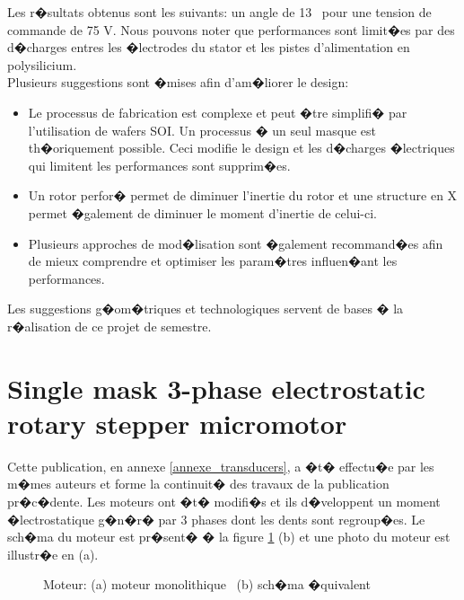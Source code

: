 Les r�sultats obtenus sont les suivants: un angle de 13 \degre \  pour une tension de commande de 75 V. Nous pouvons noter que performances sont limit�es par des d�charges entres les �lectrodes du stator et les pistes d'alimentation en polysilicium.\\


\noindent Plusieurs suggestions sont �mises afin d'am�liorer le design:
\label{am�liorations}
\begin{itemize}
\item Le processus de fabrication est complexe et peut �tre simplifi� par l'utilisation de wafers SOI. Un processus � un seul masque est th�oriquement possible. Ceci modifie le design et les d�charges �lectriques qui limitent les performances sont supprim�es.
\item Un rotor perfor� permet de diminuer l'inertie du rotor et une structure en X permet �galement de diminuer le moment d'inertie de celui-ci.
\item Plusieurs approches de mod�lisation sont �galement recommand�es afin de mieux comprendre et optimiser les param�tres influen�ant les performances.
\end{itemize}

\noindent Les suggestions g�om�triques et technologiques servent de bases � la r�alisation de ce projet de semestre.

\newpage










\section{Single mask 3-phase electrostatic rotary stepper micromotor \cite{transducers}}

Cette publication, en annexe \ref{annexe_transducers}, a �t� effectu�e par les m�mes auteurs et forme la continuit� des travaux de la publication pr�c�dente. Les moteurs ont �t� modifi�s et ils d�veloppent un moment �lectrostatique g�n�r� par 3 phases dont les dents sont regroup�es. Le sch�ma du moteur est pr�sent� � la figure \ref{fig: image_moteur_edin} (b) et une photo du moteur est illustr�e en (a).

\begin{figure}[!ht]
\centering
\caption{Moteur: (a)  moteur monolithique \ (b) sch�ma �quivalent}
\label{fig: image_moteur_edin}
\end{figure}

